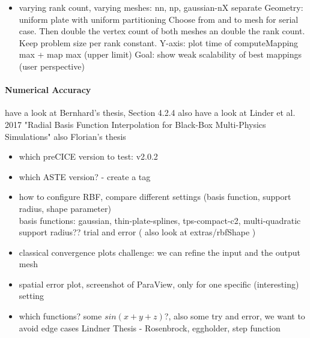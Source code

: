 \begin{itemize}
  \item varying rank count, varying meshes: nn, np, gaussian-nX separate
    Geometry: uniform plate with uniform partitioning
    Choose from and to mesh for serial case. Then double the vertex count of both meshes an double the rank count. Keep problem size per rank constant.
    Y-axis: plot time of computeMapping max + map max (upper limit) 
    Goal: show weak scalability of best mappings (user perspective)
\end{itemize}


\paragraph{Numerical Accuracy}

have a look at Bernhard's thesis, Section 4.2.4
also have a look at Linder et al. 2017 "Radial Basis Function Interpolation for Black-Box Multi-Physics Simulations"
also Florian's thesis

\begin{itemize}
  \item which preCICE version to test: v2.0.2
  \item which ASTE version? - create a tag

  \item how to configure RBF, compare different settings (basis function, support radius, shape parameter)\\
    basis functions: gaussian, thin-plate-splines, tps-compact-c2, multi-quadratic\\
    support radius?? trial and error ( also look at extras/rbfShape )

  \item classical convergence plots
    challenge: we can refine the input and the output mesh

  \item spatial error plot, screenshot of ParaView, only for one specific (interesting) setting

  \item which functions? some $sin(x+y+z)$?, also some try and error, we want to avoid edge cases
    Lindner Thesis - Rosenbrock, eggholder, step function
\end{itemize}

